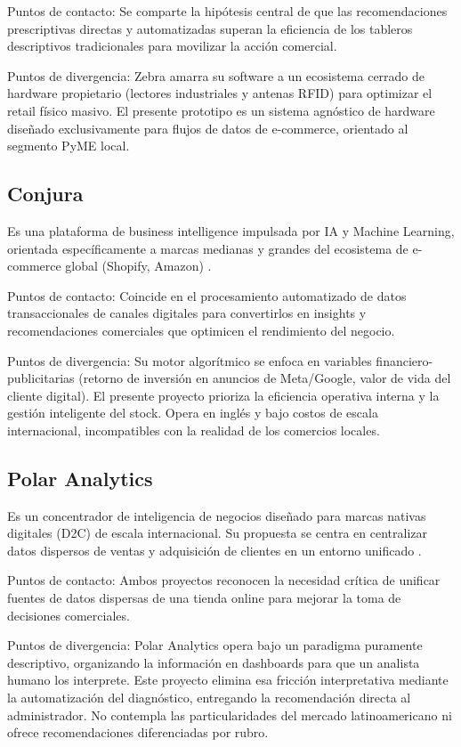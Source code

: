 Puntos de contacto: Se comparte la hipótesis central de que las recomendaciones prescriptivas directas y automatizadas superan la eficiencia de los tableros descriptivos tradicionales para movilizar la acción comercial.

Puntos de divergencia: Zebra amarra su software a un ecosistema cerrado de hardware propietario (lectores industriales y antenas RFID) para optimizar el retail físico masivo. El presente prototipo es un sistema agnóstico de hardware diseñado exclusivamente para flujos de datos de e-commerce, orientado al segmento PyME local.

\subsection{Conjura}

Es una plataforma de business intelligence impulsada por IA y Machine Learning, orientada específicamente a marcas medianas y grandes del ecosistema de e-commerce global (Shopify, Amazon) \parencite{Conjura2025}.

Puntos de contacto: Coincide en el procesamiento automatizado de datos transaccionales de canales digitales para convertirlos en insights y recomendaciones comerciales que optimicen el rendimiento del negocio.

Puntos de divergencia: Su motor algorítmico se enfoca en variables financiero-publicitarias (retorno de inversión en anuncios de Meta/Google, valor de vida del cliente digital). El presente proyecto prioriza la eficiencia operativa interna y la gestión inteligente del stock. Opera en inglés y bajo costos de escala internacional, incompatibles con la realidad de los comercios locales.

\subsection{Polar Analytics}

Es un concentrador de inteligencia de negocios diseñado para marcas nativas digitales (D2C) de escala internacional. Su propuesta se centra en centralizar datos dispersos de ventas y adquisición de clientes en un entorno unificado \parencite{PolarAnalytics2025}.

Puntos de contacto: Ambos proyectos reconocen la necesidad crítica de unificar fuentes de datos dispersas de una tienda online para mejorar la toma de decisiones comerciales.

Puntos de divergencia: Polar Analytics opera bajo un paradigma puramente descriptivo, organizando la información en dashboards para que un analista humano los interprete. Este proyecto elimina esa fricción interpretativa mediante la automatización del diagnóstico, entregando la recomendación directa al administrador. No contempla las particularidades del mercado latinoamericano ni ofrece recomendaciones diferenciadas por rubro.

